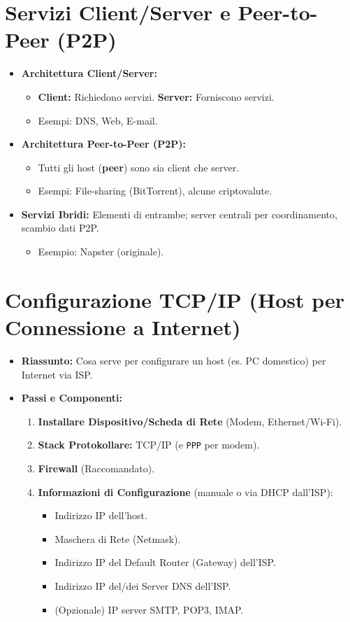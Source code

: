 \documentclass{article}
\begin{document}
\section{Servizi Client/Server e Peer-to-Peer (P2P)}
\begin{itemize}
    \item \textbf{Architettura Client/Server:}
    \begin{itemize}
        \item \textbf{Client:} Richiedono servizi. \textbf{Server:} Forniscono servizi.
        \item Esempi: DNS, Web, E-mail.
    \end{itemize}
    \item \textbf{Architettura Peer-to-Peer (P2P):}
    \begin{itemize}
        \item Tutti gli host (\textbf{peer}) sono sia client che server.
        \item Esempi: File-sharing (BitTorrent), alcune criptovalute.
    \end{itemize}
    \item \textbf{Servizi Ibridi:} Elementi di entrambe; server centrali per coordinamento, scambio dati P2P.
    \begin{itemize}
        \item Esempio: Napster (originale).
    \end{itemize}
\end{itemize}

\section{Configurazione TCP/IP (Host per Connessione a Internet)}
\begin{itemize}
    \item \textbf{Riassunto:} Cosa serve per configurare un host (es. PC domestico) per Internet via ISP.
    \item \textbf{Passi e Componenti:}
    \begin{enumerate}
        \item \textbf{Installare Dispositivo/Scheda di Rete} (Modem, Ethernet/Wi-Fi).
        \item \textbf{Stack Protokollare:} TCP/IP (e \texttt{PPP} per modem).
        \item \textbf{Firewall} (Raccomandato).
        \item \textbf{Informazioni di Configurazione} (manuale o via DHCP dall'ISP):
        \begin{itemize}
            \item Indirizzo IP dell'host.
            \item Maschera di Rete (Netmask).
            \item Indirizzo IP del Default Router (Gateway) dell'ISP.
            \item Indirizzo IP del/dei Server DNS dell'ISP.
            \item (Opzionale) IP server SMTP, POP3, IMAP.
        \end{itemize}
    \end{enumerate}
\end{itemize}
\end{document}
